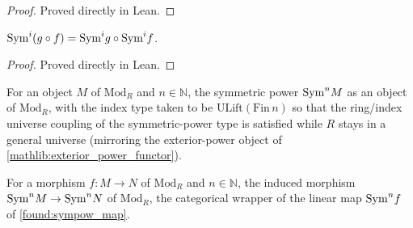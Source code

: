 \begin{proof}

\leanok
  Proved directly in Lean.
\end{proof}

\begin{lemma}
  \label{found:sympow_map_comp}
  \(\mathrm{Sym}^i(g\circ f)=\mathrm{Sym}^i g\circ\mathrm{Sym}^i f\).
\end{lemma}

\begin{proof}

\leanok
  Proved directly in Lean.
\end{proof}

\begin{definition}
  \label{found:modulecat_sympow_obj}
  For an object \(M\) of \(\mathrm{Mod}_R\) and \(n\in\mathbb N\), the symmetric
  power \(\mathrm{Sym}^n M\) as an object of \(\mathrm{Mod}_R\), with the index type taken
  to be \(\mathrm{ULift}(\mathrm{Fin}\,n)\) so that the ring/index universe
  coupling of the symmetric-power type is satisfied while \(R\) stays in a general
  universe (mirroring the exterior-power object of
  \cref{mathlib:exterior_power_functor}).
\end{definition}

\begin{definition}
  \label{found:modulecat_sympow_map}
  For a morphism \(f:M\to N\) of \(\mathrm{Mod}_R\) and \(n\in\mathbb N\), the
  induced morphism \(\mathrm{Sym}^n M\to\mathrm{Sym}^n N\) of \(\mathrm{Mod}_R\), the categorical
  wrapper of the linear map \(\mathrm{Sym}^n f\) of \cref{found:sympow_map}.
\end{definition}

